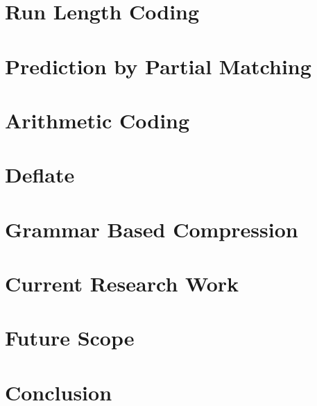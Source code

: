 \documentclass{article}
\begin{document}
\section{Run Length Coding}

\section{Prediction by Partial Matching}

\section{Arithmetic Coding}

\section{Deflate}

\section{Grammar Based Compression}

\section{Current Research Work}

\section{Future Scope}

\section{Conclusion}



\end{document}
